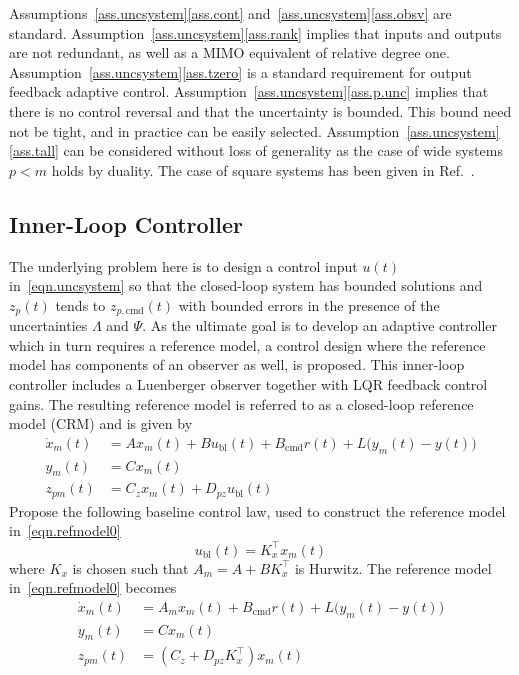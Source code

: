 \documentclass[journal]{IEEEtran}
\theoremstyle{innercustomthm}
\begin{document}
  \begin{rem-dan}
    Assumptions~\ref{ass.uncsystem}\ref{ass.cont} and~\ref{ass.uncsystem}\ref{ass.obsv} are standard.
    Assumption~\ref{ass.uncsystem}\ref{ass.rank} implies that inputs and outputs are not redundant, as well as a MIMO equivalent of relative degree one.
    Assumption~\ref{ass.uncsystem}\ref{ass.tzero} is a standard requirement for output feedback adaptive control.
    Assumption~\ref{ass.uncsystem}\ref{ass.p.unc} implies that there is no control reversal and that the uncertainty is bounded.
    This bound need not be tight, and in practice can be easily selected.
    Assumption~\ref{ass.uncsystem}\ref{ass.tall} can be considered without loss of generality as the case of wide systems $p<m$ holds by duality.
    The case of square systems has been given in Ref.\ \cite{huang.designspr.1999}.
  \end{rem-dan}

  \subsection{Inner-Loop Controller}

  The underlying problem here is to design a control input $u(t)$ in\ \eqref{eqn.uncsystem} so that the closed-loop system has bounded solutions and $z_{p}(t)$ tends to  $z_{p,\text{cmd}}(t)$ with bounded errors in the presence of the uncertainties $\Lambda$ and $\Psi$.
  As the ultimate goal is to develop an adaptive controller which in turn requires a reference model, a control design where the reference model has components of an observer as well, is proposed.
  This inner-loop controller includes a Luenberger observer together with LQR feedback control gains.
  The resulting reference model is referred to as a closed-loop reference model (CRM) and is given by
  {%
    \small
    \begin{align}
      \label{eqn.refmodel0}
      \dot{x}_{m}(t) &= Ax_{m}(t) + Bu_{\text{bl}}(t) + B_{\text{cmd}}r(t) + L\bigr(y_{m}(t)-y(t)\bigr) \nonumber \\
      y_{m}(t) &= Cx_{m}(t) \\
      z_{pm}(t) &= C_{z}x_{m}(t) + D_{pz}u_{\text{bl}}(t) \nonumber
    \end{align}
  }%
  Propose the following baseline control law, used to construct the reference model in\ \eqref{eqn.refmodel0}
  \begin{equation}
    \label{eqn.ubl}
    u_{\text{bl}}(t) = K_{x}^{\top}x_{m}(t)
  \end{equation}
  where $K_{x}$ is chosen such that $A_{m}=A+BK_{x}^{\top}$ is Hurwitz.
  The reference model in\ \eqref{eqn.refmodel0} becomes
  {%
    \small
    \begin{align}
      \label{eqn.refmodel}
      \dot{x}_{m}(t) &= A_{m}x_{m}(t) + B_{\text{cmd}}r(t) + L\bigr(y_{m}(t)-y(t)\bigr) \nonumber \\
      y_{m}(t) &= Cx_{m}(t) \\
      z_{pm}(t) &= (C_{z} + D_{pz}K_{x}^{\top})x_{m}(t) \nonumber
    \end{align}
  }%
\end{document}
